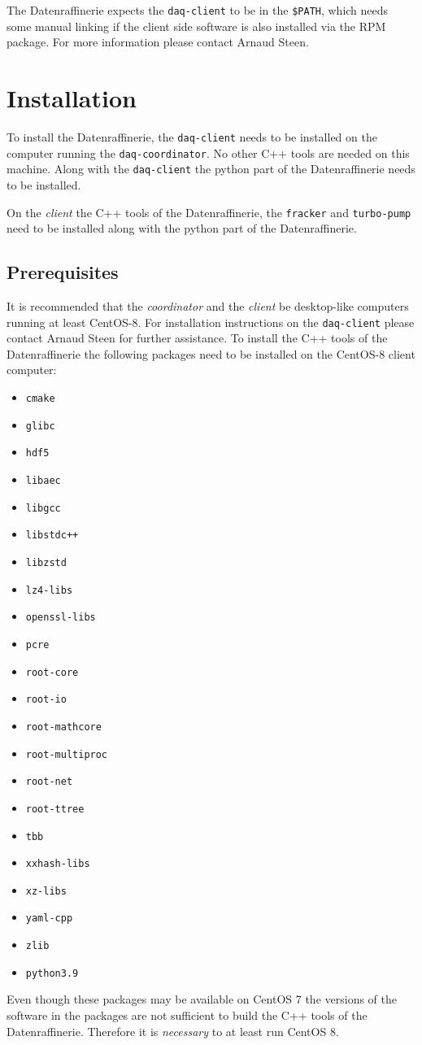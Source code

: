 \documentclass[11pt]{article}
\begin{document}
The Datenraffinerie expects the \texttt{daq-client} to be in the \texttt{\$PATH}, which needs some manual linking if the client side software is also installed via the RPM package. For more information please contact Arnaud Steen.

\section{Installation}
To install the Datenraffinerie, the \texttt{daq-client} needs to be installed on the computer running the \texttt{daq-coordinator}. No other C++ tools are needed on this machine. Along with the \texttt{daq-client} the python part of the Datenraffinerie needs to be installed.

On the \emph{client} the C++ tools of the Datenraffinerie, the \texttt{fracker} and \texttt{turbo-pump} need to be installed along with the python part of the Datenraffinerie.
\subsection{Prerequisites}
It is recommended that the \emph{coordinator} and the \emph{client} be desktop-like computers running at least CentOS-8. For installation instructions on the \texttt{daq-client} please contact Arnaud Steen for further assistance. To install the C++ tools of the Datenraffinerie the following packages need to be installed on the CentOS-8 client computer:
\begin{itemize}
	\item \texttt{cmake}
	\item \texttt{glibc}
	\item \texttt{hdf5}
	\item \texttt{libaec}
	\item \texttt{libgcc}
	\item \texttt{libstdc++}
	\item \texttt{libzstd}
	\item \texttt{lz4-libs}
	\item \texttt{openssl-libs}
	\item \texttt{pcre}
	\item \texttt{root-core}
	\item \texttt{root-io}
	\item \texttt{root-mathcore}
	\item \texttt{root-multiproc}
	\item \texttt{root-net}
	\item \texttt{root-ttree}
	\item \texttt{tbb}
	\item \texttt{xxhash-libs}
	\item \texttt{xz-libs}
	\item \texttt{yaml-cpp}
	\item \texttt{zlib}
	\item \texttt{python3.9}
\end{itemize}
Even though these packages may be available on CentOS 7 the versions of the software in the packages are not sufficient to build the C++ tools of the Datenraffinerie. Therefore it is \emph{necessary} to at least run CentOS 8.
\end{document}
